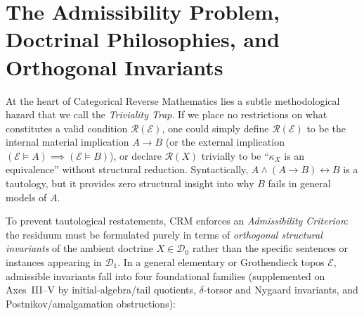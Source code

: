 \section{The Admissibility Problem, Doctrinal Philosophies, and Orthogonal Invariants}\label{sec:admissibility}

At the heart of Categorical Reverse Mathematics lies a subtle methodological hazard that we call the \emph{Triviality Trap}. If we place no restrictions on what constitutes a valid condition $\mathcal{R}(\mathcal{E})$, one could simply define $\mathcal{R}(\mathcal{E})$ to be the internal material implication $A \to B$ (or the external implication $(\mathcal{E} \models A) \implies (\mathcal{E} \models B)$), or declare $\mathcal{R}(X)$ trivially to be ``$\kappa_X$ is an equivalence'' without structural reduction. Syntactically, $A \wedge (A \to B) \leftrightarrow B$ is a tautology, but it provides zero structural insight into why $B$ fails in general models of $A$.

To prevent tautological restatements, $\mathrm{CRM}$ enforces an \emph{Admissibility Criterion}: the residuum must be formulated purely in terms of \emph{orthogonal structural invariants} of the ambient doctrine $X \in \mathcal{D}_0$ rather than the specific sentences or instances appearing in $\mathcal{D}_1$. In a general elementary or Grothendieck topos $\mathcal{E}$, admissible invariants fall into four foundational families (supplemented on Axes~III--V by initial-algebra/tail quotients, $\delta$-torsor and Nygaard invariants, and Postnikov/amalgamation obstructions):

